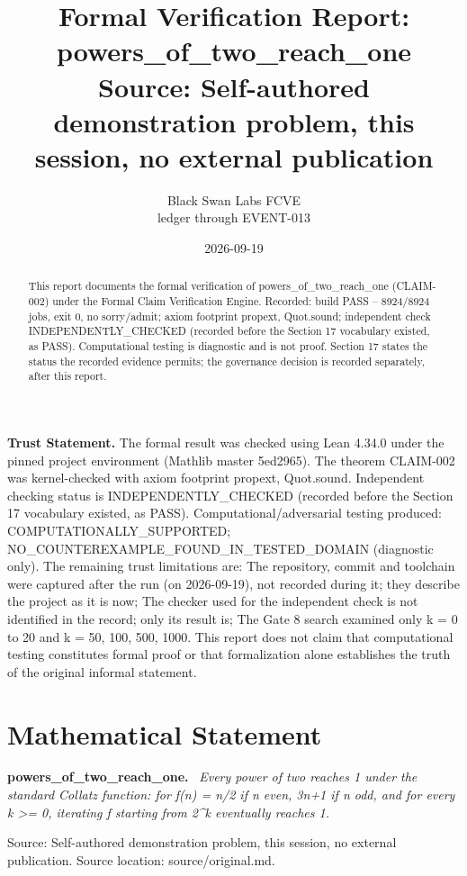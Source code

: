 \documentclass[11pt]{article}
\title{Formal Verification Report: powers\_of\_two\_reach\_one\\[0.5em]{\large Source: Self-authored demonstration problem, this session, no external publication}}
\author{Black Swan Labs FCVE \\ ledger through EVENT-013}
\date{2026-09-19}
\newenvironment{sourceresult}[1]{\par\medskip\noindent\textbf{#1.}\ \itshape}{\par\medskip}
\begin{document}
\maketitle

\noindent\textbf{Trust Statement.} The formal result was checked using Lean 4.34.0 under the pinned project environment (Mathlib master 5ed2965). The theorem CLAIM-002 was kernel-checked with axiom footprint propext, Quot.sound. Independent checking status is INDEPENDENTLY\_CHECKED (recorded before the Section 17 vocabulary existed, as PASS). Computational/adversarial testing produced: COMPUTATIONALLY\_SUPPORTED; NO\_COUNTEREXAMPLE\_FOUND\_IN\_TESTED\_DOMAIN (diagnostic only). The remaining trust limitations are: The repository, commit and toolchain were captured after the run (on 2026-09-19), not recorded during it; they describe the project as it is now; The checker used for the independent check is not identified in the record; only its result is; The Gate 8 search examined only k = 0 to 20 and k = 50, 100, 500, 1000. This report does not claim that computational testing constitutes formal proof or that formalization alone establishes the truth of the original informal statement.

\begin{abstract}
This report documents the formal verification of powers\_of\_two\_reach\_one (CLAIM-002) under the Formal Claim Verification Engine. Recorded: build PASS -- 8924/8924 jobs, exit 0, no sorry/admit; axiom footprint propext, Quot.sound; independent check INDEPENDENTLY\_CHECKED (recorded before the Section 17 vocabulary existed, as PASS). Computational testing is diagnostic and is not proof. Section 17 states the status the recorded evidence permits; the governance decision is recorded separately, after this report.
\end{abstract}

\section{Mathematical Statement}
\begin{sourceresult}{powers\_of\_two\_reach\_one}
Every power of two reaches 1 under the standard Collatz function: for f(n) = n/2 if n even, 3n+1 if n odd, and for every k >= 0, iterating f starting from 2\textasciicircum{}k eventually reaches 1.
\end{sourceresult}
Source: Self-authored demonstration problem, this session, no external publication. Source location: source/original.md.
\end{document}
